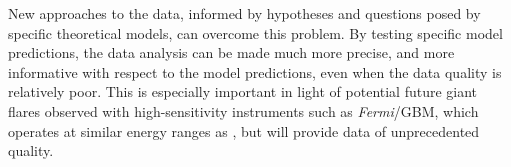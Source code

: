 \documentclass{emulateapj}
\begin{document}
New approaches to the data, informed by hypotheses and questions posed by specific theoretical models, can overcome this problem. By testing specific model predictions, the data analysis can be made much more precise, and more informative with respect to the model predictions, even when the data quality is relatively poor. This is especially important in light of potential future giant flares observed with high-sensitivity instruments such as {\it Fermi}/GBM, which operates at similar energy ranges as \rhessi, but will provide data of unprecedented quality.



\end{document}
